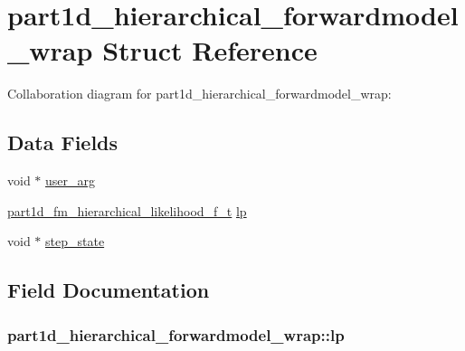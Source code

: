 \hypertarget{structpart1d__hierarchical__forwardmodel__wrap}{}\section{part1d\+\_\+hierarchical\+\_\+forwardmodel\+\_\+wrap Struct Reference}
\label{structpart1d__hierarchical__forwardmodel__wrap}


Collaboration diagram for part1d\+\_\+hierarchical\+\_\+forwardmodel\+\_\+wrap\+:
\subsection*{Data Fields}
\begin{DoxyCompactItemize}
\item 
void $\ast$ \hyperlink{structpart1d__hierarchical__forwardmodel__wrap_ac8850ffd6ff8d003abe793231be2069a}{user\+\_\+arg}
\item 
\hyperlink{forwardmodel__f_8h_aa4409a62214e80b14f01eb769ea77c0f}{part1d\+\_\+fm\+\_\+hierarchical\+\_\+likelihood\+\_\+f\+\_\+t} \hyperlink{structpart1d__hierarchical__forwardmodel__wrap_aa1a9297be183ef417006a624c74a946a}{lp}
\item 
void $\ast$ \hyperlink{structpart1d__hierarchical__forwardmodel__wrap_a884b7afabf5dd3b89bd27e02e2349f4b}{step\+\_\+state}
\end{DoxyCompactItemize}


\subsection{Field Documentation}
\subsubsection[{\texorpdfstring{lp}{lp}}]{ part1d\+\_\+hierarchical\+\_\+forwardmodel\+\_\+wrap\+::lp}\hypertarget{structpart1d__hierarchical__forwardmodel__wrap_aa1a9297be183ef417006a624c74a946a}{}\label{structpart1d__hierarchical__forwardmodel__wrap_aa1a9297be183ef417006a624c74a946a}


